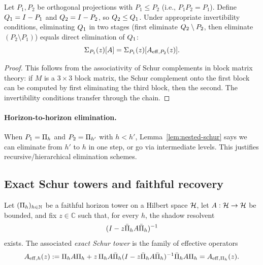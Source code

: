 \begin{lemma}
\label{lem:nested-schur}
Let $P_1, P_2$ be orthogonal projections with $P_1 \le P_2$ (i.e., $P_1 P_2 = P_1$).
Define $Q_1 = I - P_1$ and $Q_2 = I - P_2$, so $Q_2 \le Q_1$.
Under appropriate invertibility conditions, eliminating $Q_1$ in two stages (first eliminate $Q_2 \setminus P_2$, then eliminate $(P_2 \setminus P_1)$) equals direct elimination of $Q_1$:
\[
\Sigma_{P_1}(z)[A] = \Sigma_{P_1}(z)[A_{\mathrm{eff},P_2}(z)].
\]
\end{lemma}

\begin{proof}
This follows from the associativity of Schur complements in block matrix theory: if $M$ is a $3 \times 3$ block matrix, the Schur complement onto the first block can be computed by first eliminating the third block, then the second.
The invertibility conditions transfer through the chain.
\end{proof}

\paragraph{Horizon-to-horizon elimination.}
When $P_1 = \Pi_{h}$ and $P_2 = \Pi_{h'}$ with $h < h'$, Lemma~\ref{lem:nested-schur} says we can eliminate from $h'$ to $h$ in one step, or go via intermediate levels.
This justifies recursive/hierarchical elimination schemes.

\subsection{Exact Schur towers and faithful recovery}
\label{subsec:exact-schur-towers}

\begin{definition}
\label{def:exact-schur-tower-general}
Let $(\Pi_{h})_{h\in\mathbb{N}}$ be a faithful horizon tower on a Hilbert space
$\mathcal{H}$, let $A:\mathcal{H}\to\mathcal{H}$ be bounded, and fix
$z\in\mathbb{C}$ such that, for every $h$, the shadow resolvent
\[
(I-z\bar{\Pi}_{h}A\bar{\Pi}_{h})^{-1}
\]
exists. The associated \emph{exact Schur tower} is the family of effective
operators
\[
A_{\mathrm{eff},h}(z)
:=
\Pi_{h}A\Pi_{h}
+
z\,\Pi_{h}A\bar{\Pi}_{h}(I-z\bar{\Pi}_{h}A\bar{\Pi}_{h})^{-1}\bar{\Pi}_{h}A\Pi_{h}
=
A_{\mathrm{eff},\Pi_{h}}(z).
\]
\end{definition}

